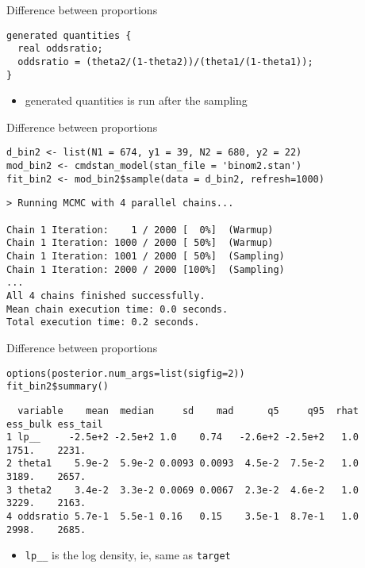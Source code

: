 \documentclass[finnish,english,t]{beamer}
\begin{document}
\begin{frame}[fragile]{Difference between proportions}

  
  {\small
\begin{verbatim}
generated quantities {
  real oddsratio;
  oddsratio = (theta2/(1-theta2))/(theta1/(1-theta1));
}
\end{verbatim}
    }

    \begin{itemize}
    \item generated quantities is run after the sampling
    \end{itemize}
    
\end{frame}

\begin{frame}[fragile]{Difference between proportions}
  
  {\small
\begin{verbatim}
d_bin2 <- list(N1 = 674, y1 = 39, N2 = 680, y2 = 22)
mod_bin2 <- cmdstan_model(stan_file = 'binom2.stan')
fit_bin2 <- mod_bin2$sample(data = d_bin2, refresh=1000)
\end{verbatim}
  }

  {\footnotesize
\begin{verbatim}
> Running MCMC with 4 parallel chains...

Chain 1 Iteration:    1 / 2000 [  0%]  (Warmup) 
Chain 1 Iteration: 1000 / 2000 [ 50%]  (Warmup) 
Chain 1 Iteration: 1001 / 2000 [ 50%]  (Sampling) 
Chain 1 Iteration: 2000 / 2000 [100%]  (Sampling) 
...
All 4 chains finished successfully.
Mean chain execution time: 0.0 seconds.
Total execution time: 0.2 seconds.
\end{verbatim}
  }

\end{frame}

\begin{frame}[fragile]{Difference between proportions}
  
  {\small
\begin{verbatim}
options(posterior.num_args=list(sigfig=2))
fit_bin2$summary()
\end{verbatim}
  }

  {\scriptsize
\begin{verbatim}
  variable    mean  median     sd    mad      q5     q95  rhat ess_bulk ess_tail
1 lp__     -2.5e+2 -2.5e+2 1.0    0.74   -2.6e+2 -2.5e+2   1.0    1751.    2231.
2 theta1    5.9e-2  5.9e-2 0.0093 0.0093  4.5e-2  7.5e-2   1.0    3189.    2657.
3 theta2    3.4e-2  3.3e-2 0.0069 0.0067  2.3e-2  4.6e-2   1.0    3229.    2163.
4 oddsratio 5.7e-1  5.5e-1 0.16   0.15    3.5e-1  8.7e-1   1.0    2998.    2685.
\end{verbatim}
  }

  \begin{itemize}
  \item<2-> {\tt lp\_\_} is the log density, ie, same as {\tt target}
  \end{itemize}

\end{frame}
\end{document}

